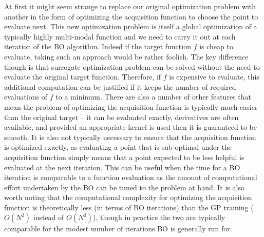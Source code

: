 At first it might seem strange to replace our original optimization problem with
another in the form of optimizing the acquisition function to choose the point
to evaluate next.  This new optimization problem is itself a global
optimization of a typically highly multi-modal function and we need to carry it out
at each iteration of the BO algorithm.  Indeed if the target function $f$ is cheap to
evaluate, taking such an approach would be rather foolish.
The key difference though
is that surrogate optimization problem can be solved without the need to evaluate
the original target function.  Therefore, if $f$ is expensive to evaluate, this additional
computation can be justified if it keeps the number of required evaluations of $f$ to
a minimum.  There are also a number of other features that mean the problem of
optimizing the acquisition function is typically much easier than the original target --
it can be evaluated exactly, derivatives are often available, and provided an appropriate kernel
is used then it is guaranteed to be smooth.  It is also not typically necessary to ensure
that the acquisition function is optimized exactly, as evaluating a point that is
sub-optimal under the acquisition function simply means that a point expected to be less
helpful is evaluated at the next iteration.  This can be useful when the time for a BO
iteration is comparable to a function evaluation as the amount of computational effort
undertaken by the BO can be tuned to the problem at hand.  It is also worth noting that
the computational complexity for optimizing the acquisition function is theoretically less
(in terms of BO iterations) than the GP training ($O(N^2)$ instead of $O(N^3)$), though in
practice the two are typically comparable for the modest number of iterations BO is
generally run for.

